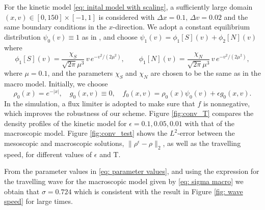 \documentclass[11pt,twoside]{article}
\theoremstyle{nonumberplain}
\newcommand{\XR}[1]{\textcolor{blue}{#1}}
\begin{document}
{ {
For the kinetic model \eqref{eq: inital model with scaling}, 
a sufficiently large domain $(x,v) \in [0,150] \times [-1,1]$ is considered with $\Delta x = 0.1, \, \Delta v = 0.02$ and the same boundary conditions in the $x$-direction. 
We adopt a constant equilibrium distribution 
$\psi_0(v) \equiv 1$ as in \cite{calvez2016chemotactic}, and choose $\psi_1(v)=\phi_1[S](v)+\phi_2[N](v)$ where
\[
\phi_1[S](v) = \frac{\chi_S}{\sqrt{2\pi}\mu^3}\, v\, e^{-v^2/(2\mu^2)}, 
\qquad 
\phi_1[N](v) = \frac{\chi_N}{\sqrt{2\pi}\mu^3}\, v\, e^{-v^2/(2\mu^2)},
\]
where $\mu = 0.1$, and the parameters $\chi_S$ and $\chi_N$ are chosen to be the same as in the macro model.
Initially, we choose 
$$
    \rho_0(x) = e^{-|x|}, \quad g_0(x,v) \equiv 0, \quad f_0(x,v) = \rho_0(x) \psi_0(v) + \epsilon g_0(x,v).  
$$
}}
In the simulation, a flux limiter is adopted to make sure that $f$ is nonnegative, which improves the robustness of our scheme. 
Figure \ref{fig:conv_T} compares the density profiles of the kinetic model for $\epsilon = 0.1, 0.05, 0.01$ with that of the macroscopic model. %
Figure \ref{fig:conv_test} shows the $L^2$-error between the mesoscopic and macroscopic solutions, $\|\rho^\epsilon-\rho\|_2$, as well as the travelling speed, for different values of $\epsilon$ and T. 

From the parameter values in \eqref{eq: parameter values}, and using the expression for the travelling wave for the macroscopic model given by \eqref{eq: sigma macro} we obtain that $\sigma=0.724$ which is consistent with the result in Figure \ref{fig: wave speed} for large times.
\end{document}
